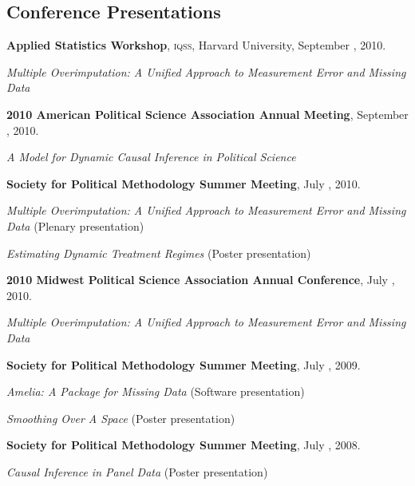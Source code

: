 \documentclass[margin,line]{res}
\newenvironment{list1}{
  \begin{list}{\ding{113}}{%
      \setlength{\itemsep}{0in}
      \setlength{\parsep}{0in} \setlength{\parskip}{0in}
      \setlength{\topsep}{0in} \setlength{\partopsep}{0in} 
      \setlength{\leftmargin}{0.17in}}}{\end{list}}
\begin{document}
\begin{resume}
\section{\textsf{\sc Conference Presentations}}

{\bf Applied Statistics Workshop}, \textsc{iqss}, Harvard University, September , 2010.
\begin{list1}
\item[] \emph{Multiple Overimputation: A Unified Approach to Measurement Error and
Missing Data}
\end{list1}\vspace{-0em}

{\bf 2010 American Political Science Association Annual Meeting}, September , 2010. 
\begin{list1} 
\item[] \emph{A Model for Dynamic Causal Inference in Political
    Science}
\end{list1}\vspace{-0em}
 {\bf Society for Political
  Methodology  Summer Meeting}, July , 2010.
\begin{list1}
\item[] \emph{Multiple Overimputation: A Unified Approach to Measurement Error and
Missing Data} (Plenary presentation)
\item[] \emph{Estimating Dynamic Treatment Regimes} (Poster presentation)
\end{list1}\vspace{-0em}

{\bf 2010 Midwest Political Science Association Annual Conference}, July , 2010. 
\begin{list1}
\item[] \emph{Multiple Overimputation: A Unified Approach to Measurement Error and
Missing Data}
\end{list1}\vspace{-0em}

{\bf Society for Political Methodology  Summer Meeting}, July , 2009.
\begin{list1}
\item[]  \emph{Amelia: A Package for Missing Data} (Software presentation)
\item[]  \emph{Smoothing Over A Space} (Poster presentation)
\end{list1}\vspace{-0em}

{\bf Society for Political Methodology  Summer Meeting}, July , 2008.
\begin{list1}
\item[] \emph{Causal Inference in Panel Data} (Poster presentation)
\end{list1}\vspace{-.5em}


\end{resume}
\end{document}

